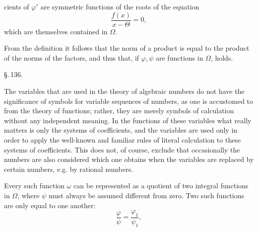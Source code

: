 cients of $\varphi'$ are symmetric functions of the roots of the equation
\[ \frac{f(x)}{x - \Theta} = 0, \]
which are themselves contained in $\Omega$.

From the definition it follows that the norm of a product is equal to the product of the norms of the factors, and thus that, if $\varphi, \psi$ are functions in $\Omega$,
holds.

\begin{center}
\S.\,136.

\end{center}

The variables that are used in the theory of algebraic numbers do not have the significance of symbols for variable sequences of numbers, as one is accustomed to from the theory of functions; rather, they are merely symbols of calculation without any independent meaning. In the functions of these variables what really matters is only the systems of coefficients, and the variables are used only in order to apply the well-known and familiar rules of literal calculation to these systems of coefficients. This does not, of course, exclude that occasionally the numbers are also considered which one obtains when the variables are replaced by certain numbers, e.g. by rational numbers.


Every such function $\omega$ can be represented as a quotient of two integral functions in $\Omega$,
where $\psi$ must always be assumed different from zero. Two such functions are only equal to one another:
\[ \frac{\varphi}{\psi} = \frac{\varphi_1}{\psi_1}, \]
